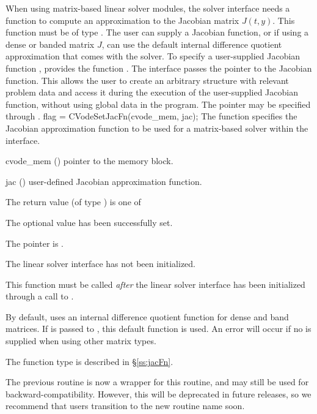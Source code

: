 When using matrix-based linear solver modules, the
{\cvls} solver interface needs a function to compute an approximation to
the Jacobian matrix $J(t,y)$.  This function must be of type .
The user can supply a Jacobian function, or if using a
dense or banded matrix $J$, can use the default internal difference
quotient approximation
that comes with the {\cvls} solver.
To specify a user-supplied Jacobian function , {\cvls} provides
the function .
The {\cvls} interface passes the pointer 
to the Jacobian function. This allows the user to
create an arbitrary structure with relevant problem data and access it
during the execution of the user-supplied Jacobian function, without
using global data in the program.
The pointer  may be specified through .
{
  flag = CVodeSetJacFn(cvode\_mem, jac);
}
{
  The function  specifies the Jacobian
  approximation function to be used for a matrix-based solver within
  the {\cvls} interface.
}
{
  \begin{args}
  \item[cvode\_mem] ()
    pointer to the {\cvode} memory block.
  \item[jac] ()
    user-defined Jacobian approximation function.
  \end{args}
}
{
  The return value  (of type ) is one of
  \begin{args}
  \item[\Id{CVLS\_SUCCESS}]
    The optional value has been successfully set.
  \item[\Id{CVLS\_MEM\_NULL}]
    The  pointer is .
  \item[\Id{CVLS\_LMEM\_NULL}]
    The {\cvls} linear solver interface has not been initialized.
  \end{args}
}
{
  This function must be called \emph{after} the {\cvls} linear solver
  interface has been initialized through a call to
  .

  By default, {\cvls} uses an internal difference quotient function
  for dense and band matrices.  If  is passed to ,
  this default function is used.  An error will occur if no 
  is supplied when using other matrix types.

  The function type  is described in \S\ref{ss:jacFn}.

  The previous routine  is now a wrapper for this
  routine, and may still be used for backward-compatibility.  However,
  this will be deprecated in future releases, so we recommend that
  users transition to the new routine name soon.
}
